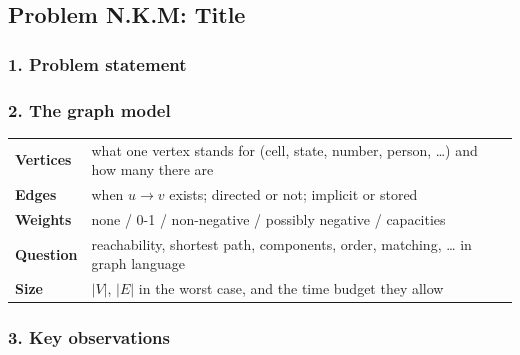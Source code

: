 \subsection{Problem N.K.M: Title}


\subsubsection*{1. Problem statement}

\subsubsection*{2. The graph model}
\begin{modelbox}
\renewcommand{\arraystretch}{1.35}
\begin{tabularx}{\linewidth}{@{}>{\bfseries}l X@{}}
Vertices & what one vertex stands for (cell, state, number, person, \ldots) and how many there are \\
Edges & when $u \to v$ exists; directed or not; implicit or stored \\
Weights & none / 0-1 / non-negative / possibly negative / capacities \\
Question & reachability, shortest path, components, order, matching, \ldots{} in graph language \\
Size & $|V|$, $|E|$ in the worst case, and the time budget they allow \\
\end{tabularx}
\end{modelbox}

\subsubsection*{3. Key observations}


